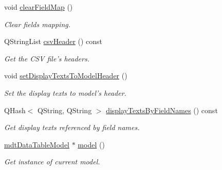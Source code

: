 \begin{DoxyCompactItemize}
void \hyperlink{classmdt_data_table_manager_a10c9f9d57d6c35fa5721906c79376ec4}{clearFieldMap} ()
\begin{DoxyCompactList}\small\item\em Clear fields mapping. \end{DoxyCompactList}\item 
QStringList \hyperlink{classmdt_data_table_manager_a785fbce3537e9e75ecdd49d29a6e8959}{csvHeader} () const 
\begin{DoxyCompactList}\small\item\em Get the CSV file's headers. \end{DoxyCompactList}\item 
void \hyperlink{classmdt_data_table_manager_a87e9b26f462165c93a64f8ac6080b13d}{setDisplayTextsToModelHeader} ()
\begin{DoxyCompactList}\small\item\em Set the display texts to model's header. \end{DoxyCompactList}\item 
QHash$<$ QString, QString $>$ \hyperlink{classmdt_data_table_manager_ac8884e4e2d58c6f7e3db180aca5a2772}{displayTextsByFieldNames} () const 
\begin{DoxyCompactList}\small\item\em Get display texts referenced by field names. \end{DoxyCompactList}\item 
\hyperlink{classmdt_data_table_model}{mdtDataTableModel} $\ast$ \hyperlink{classmdt_data_table_manager_a4033591be8c92f6806363515bad9413f}{model} ()
\begin{DoxyCompactList}\small\item\em Get instance of current model. \end{DoxyCompactList}\end{DoxyCompactItemize}
